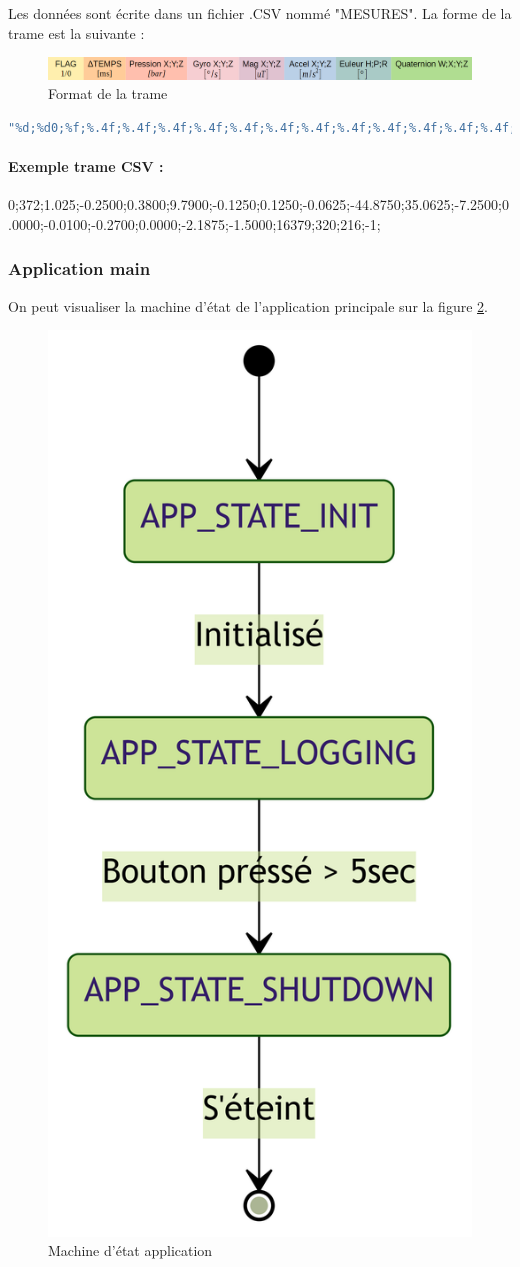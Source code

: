 {	Les données sont écrite dans un fichier .CSV nommé "MESURES". La forme de la trame est la suivante :
	
	\begin{figure}[h]
		\centering
		\includegraphics[width=1\textwidth]{Figures/Dev-SOFT/Trame}
		\caption{Format de la trame}
		\label{fig:trame}
	\end{figure}

	\begin{lstlisting}[frame=single, language=C, caption={Ecriture du buffer}, captionpos=b, breaklines=true]
"%d;%d0;%f;%.4f;%.4f;%.4f;%.4f;%.4f;%.4f;%.4f;%.4f;%.4f;%.4f;%.4f;%.4f;%.4f;%.4f;%.4f;%d;%d;%d;%d;"
	\end{lstlisting}
	
	\paragraph{Exemple trame CSV :} 
	0;372;1.025;-0.2500;0.3800;9.7900;-0.1250;0.1250;-0.0625;-44.8750;35.0625;-7.2500;0.0000;-0.0100;-0.2700;0.0000;-2.1875;-1.5000;16379;320;216;-1;

	
	\subsubsection{Application main}
	On peut visualiser la machine d'état de l'application principale sur la figure \ref{fig:stateapp}.
	\begin{figure}[h]
		\centering
		\includegraphics[width=0.28\linewidth]{Figures/Dev-SOFT/StateApp}
		\caption{Machine d'état application}
		\label{fig:stateapp}
	\end{figure}

}
